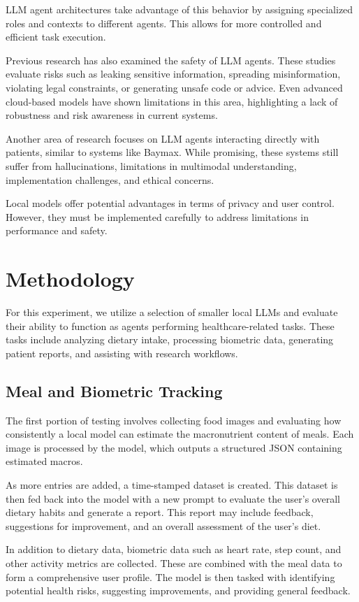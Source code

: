 \documentclass[sigconf]{acmart}
\begin{document}
LLM agent architectures take advantage of this behavior by assigning specialized roles and contexts to different agents. This allows for more controlled and efficient task execution.

Previous research has also examined the safety of LLM agents. These studies evaluate risks such as leaking sensitive information, spreading misinformation, violating legal constraints, or generating unsafe code or advice. Even advanced cloud-based models have shown limitations in this area, highlighting a lack of robustness and risk awareness in current systems.

Another area of research focuses on LLM agents interacting directly with patients, similar to systems like Baymax. While promising, these systems still suffer from hallucinations, limitations in multimodal understanding, implementation challenges, and ethical concerns.

Local models offer potential advantages in terms of privacy and user control. However, they must be implemented carefully to address limitations in performance and safety.

\section{Methodology}

For this experiment, we utilize a selection of smaller local LLMs and evaluate their ability to function as agents performing healthcare-related tasks. These tasks include analyzing dietary intake, processing biometric data, generating patient reports, and assisting with research workflows.

\subsection{Meal and Biometric Tracking}

The first portion of testing involves collecting food images and evaluating how consistently a local model can estimate the macronutrient content of meals. Each image is processed by the model, which outputs a structured JSON containing estimated macros.

As more entries are added, a time-stamped dataset is created. This dataset is then fed back into the model with a new prompt to evaluate the user’s overall dietary habits and generate a report. This report may include feedback, suggestions for improvement, and an overall assessment of the user’s diet.

In addition to dietary data, biometric data such as heart rate, step count, and other activity metrics are collected. These are combined with the meal data to form a comprehensive user profile. The model is then tasked with identifying potential health risks, suggesting improvements, and providing general feedback.
\end{document}
